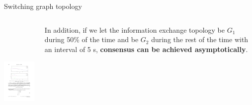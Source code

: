 \begin{frame}{Switching graph topology}

\begin{columns}
 \begin{column}{.70\textwidth}
	\begin{center}
		\includegraphics[height=6cm]{images/Switch4.pdf}
	\end{center}
	\vskip 0.3cm
 \end{column}

 \begin{column}{.30\textwidth}
	 In addition, if we let the information exchange topology be $G_1$ during 50\% of the time 
	 and be $G_2$ during the rest of the time with an interval of 5 s,
	 {\textcolor{green!40!black}{\fontsize{13}{15}\textbf{consensus can be achieved asymptotically}}}.
 \end{column}
\end{columns}
\vskip 0.3cm

\end{frame}

